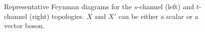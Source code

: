 \begin{figure}[ht]
\hspace{1.0cm}
  \caption{Representative Feynman diagrams for the 
    $s$-channel (left) and $t$-channel (right) topologies. 
    $X$ and $X'$ can be either a scalar or a vector boson. 
    \label{fig:resfeyn}} 
\end{figure}
